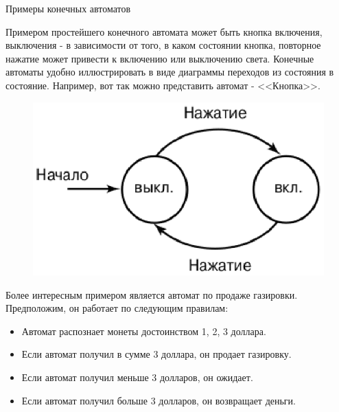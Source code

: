 \documentclass[12pt, pdf, hyperref={unicode},handout]{beamer}
\begin{document}
\begin{frame}{Примеры конечных автоматов}
  \begin{block}

    \small{
      Примером простейшего конечного автомата может быть кнопка включения, выключения - в зависимости от того, в каком состоянии кнопка, повторное нажатие может привести к включению или выключению света. Конечные автоматы удобно иллюстрировать в виде диаграммы переходов из состояния в состояние. Например, вот так можно представить автомат - <<Кнопка>>.
      \begin{figure}[htb] 
    \centering
    \includegraphics [scale=1.0]{ris1.eps}
  \end{figure}

  Более интересным примером является автомат по продаже газировки. Предположим, он работает по следующим правилам:
  \begin{itemize}
  \item{Автомат распознает монеты достоинством 1, 2, 3 доллара.}
  \item{Если автомат получил в сумме 3 доллара, он продает газировку.}
  \item{Если автомат получил меньше 3 долларов, он ожидает.}
    \item{Если автомат получил больше 3 долларов, он возвращает деньги.}
    
    \end{itemize}
}

  \end{block}
  
\end{frame}
\end{document}
